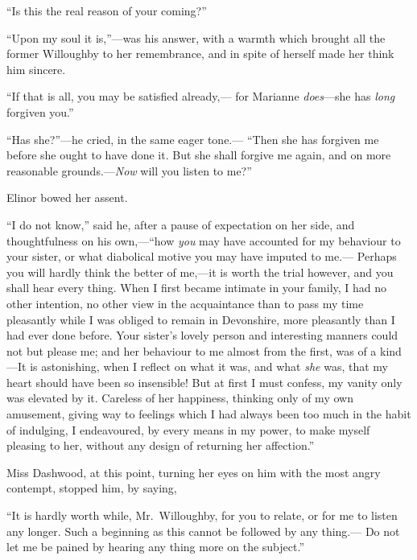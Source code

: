 \documentclass{article}
\begin{document}
``Is this the real reason of your coming?''

``Upon my soul it is,''---was his answer, with a warmth
which brought all the former Willoughby to her remembrance,
and in spite of herself made her think him sincere.

``If that is all, you may be satisfied already,---%
for Marianne \emph{does}---she has \emph{long} forgiven you.''

``Has she?''---he cried, in the same eager tone.---%
``Then she has forgiven me before she ought to have done it.
But she shall forgive me again, and on more reasonable
grounds.---\emph{Now} will you listen to me?''

Elinor bowed her assent.

``I do not know,'' said he, after a pause of expectation
on her side, and thoughtfulness on his own,---``how \emph{you}
may have accounted for my behaviour to your sister,
or what diabolical motive you may have imputed to me.---%
Perhaps you will hardly think the better of me,---it is
worth the trial however, and you shall hear every thing.
When I first became intimate in your family, I had no
other intention, no other view in the acquaintance
than to pass my time pleasantly while I was obliged to remain
in Devonshire, more pleasantly than I had ever done before.
Your sister's lovely person and interesting manners
could not but please me; and her behaviour to me almost
from the first, was of a kind---It is astonishing,
when I reflect on what it was, and what \emph{she} was, that my
heart should have been so insensible!  But at first
I must confess, my vanity only was elevated by it.
Careless of her happiness, thinking only of my own amusement,
giving way to feelings which I had always been too much
in the habit of indulging, I endeavoured, by every means
in my power, to make myself pleasing to her, without any
design of returning her affection.''

Miss Dashwood, at this point, turning her eyes on him
with the most angry contempt, stopped him, by saying,

``It is hardly worth while, Mr.\ Willoughby,
for you to relate, or for me to listen any longer.
Such a beginning as this cannot be followed by any thing.---%
Do not let me be pained by hearing any thing more on
the subject.''
\end{document}
